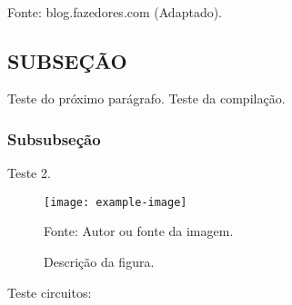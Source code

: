 \documentclass[12pt]{article}
\begin{document}
    \begin{table}
        \caption{Tabela do cores dos resistores fixos.}
        \label{tab:corResist}
        \centering
        \vspace{0.5em}
        \\
        \footnotesize Fonte: blog.fazedores.com (Adaptado)\nocite{codigo_cores_resistores}.
    \end{table}

    \subsection{SUBSEÇÃO}\indent
    
    Teste do próximo parágrafo. Teste da compilação.

    \subsubsection{Subsubseção}\indent
    
    Teste 2.
    \begin{figure}[h!]
        \centering
        \begin{minipage}{0.5\textwidth}
            \centering
            \caption{Descrição da figura.}
            \texttt{[image: example-image]}
            \raggedright \footnotesize Fonte: Autor ou fonte da imagem.
            \label{fig:minhaFigura}
        \end{minipage}
    \end{figure}
\newpage
Teste circuitos:
\end{document}
